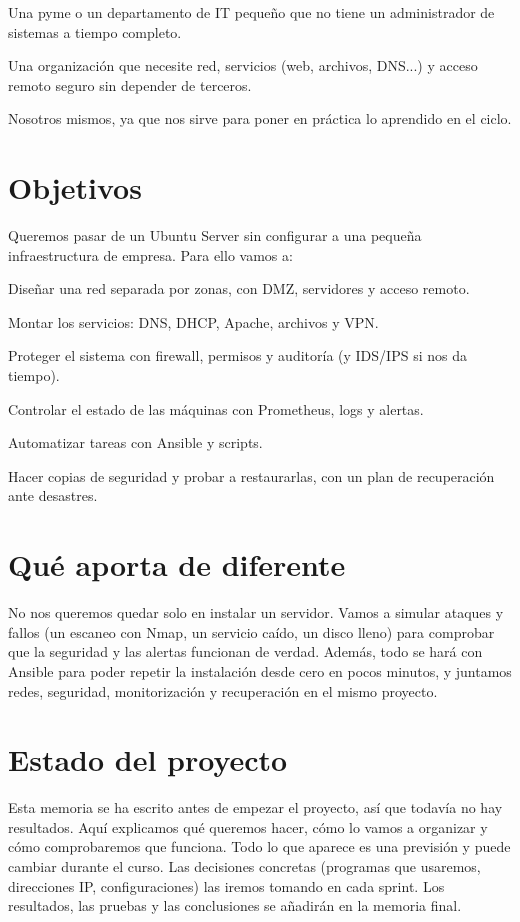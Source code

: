 \documentclass[11pt,a4paper]{report}
\begin{document}
\par\noindent\textbullet\quad  Una pyme o un departamento de IT pequeño que no tiene un administrador de sistemas a tiempo completo. 
\par\noindent\textbullet\quad  Una organización que necesite red, servicios (web, archivos, DNS...) y acceso remoto seguro sin depender de terceros. 
\par\noindent\textbullet\quad  Nosotros mismos, ya que nos sirve para poner en práctica lo aprendido en el ciclo. 
\section{Objetivos}
 Queremos pasar de un Ubuntu Server sin configurar a una pequeña infraestructura de empresa. Para ello vamos a: 
\par\noindent\textbullet\quad  Diseñar una red separada por zonas, con DMZ, servidores y acceso remoto. 
\par\noindent\textbullet\quad  Montar los servicios: DNS, DHCP, Apache, archivos y VPN. 
\par\noindent\textbullet\quad  Proteger el sistema con firewall, permisos y auditoría (y IDS/IPS si nos da tiempo). 
\par\noindent\textbullet\quad  Controlar el estado de las máquinas con Prometheus, logs y alertas. 
\par\noindent\textbullet\quad  Automatizar tareas con Ansible y scripts. 
\par\noindent\textbullet\quad  Hacer copias de seguridad y probar a restaurarlas, con un plan de recuperación ante desastres. 
\section{Qué aporta de diferente}
 No nos queremos quedar solo en instalar un servidor. Vamos a simular ataques y fallos (un escaneo con Nmap, un servicio caído, un disco lleno) para comprobar que la seguridad y las alertas funcionan de verdad. Además, todo se hará con Ansible para poder repetir la instalación desde cero en pocos minutos, y juntamos redes, seguridad, monitorización y recuperación en el mismo proyecto. 
\section{Estado del proyecto}
 Esta memoria se ha escrito antes de empezar el proyecto, así que todavía no hay resultados. Aquí explicamos qué queremos hacer, cómo lo vamos a organizar y cómo comprobaremos que funciona. Todo lo que aparece es una previsión y puede cambiar durante el curso. Las decisiones concretas (programas que usaremos, direcciones IP, configuraciones) las iremos tomando en cada sprint. Los resultados, las pruebas y las conclusiones se añadirán en la memoria final.
\end{document}
